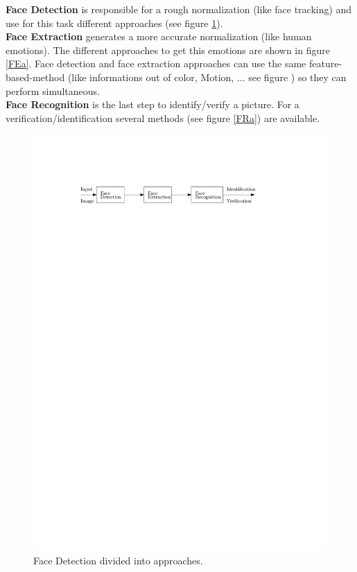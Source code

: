 \documentclass[Bachelorarbeit.tex]{subfiles}
\begin{document}
\textbf{Face Detection} is responsible for a rough normalization (like face tracking) and use for this task different approaches (see figure \ref{FDa}).\\
\textbf{Face Extraction} generates a more accurate normalization (like human emotions). The different approaches to get this emotions are shown in figure \ref{FEa}. Face detection and face extraction approaches can use the same feature-based-method (like informations out of color, Motion, ... see figure \label{FDaSurvey}) so they can perform simultaneous. \\
\textbf{Face Recognition} is the last step to identify/verify a picture. For a verification/identification several methods (see figure \ref{FRa}) are available.


\begin{figure}[!h] %
\centering
\includegraphics[page=3,scale=1]{./pictures/drawings}
\caption{Face Detection divided into approaches. \label{FDa}}
\end{figure}
\end{document}
